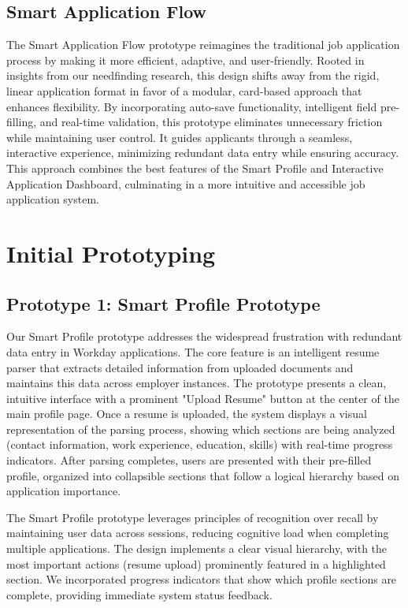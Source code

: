 \documentclass[
	letterpaper, %
]{jdf}
\begin{document}
\subsection{Smart Application Flow}
The Smart Application Flow prototype reimagines the traditional job application process by making it more efficient, adaptive, and user-friendly. Rooted in insights from our needfinding research, this design shifts away from the rigid, linear application format in favor of a modular, card-based approach that enhances flexibility. By incorporating auto-save functionality, intelligent field pre-filling, and real-time validation, this prototype eliminates unnecessary friction while maintaining user control. It guides applicants through a seamless, interactive experience, minimizing redundant data entry while ensuring accuracy. This approach combines the best features of the Smart Profile and Interactive Application Dashboard, culminating in a more intuitive and accessible job application system.

\hfill \break
\hfill \break


\section{Initial Prototyping}
\subsection{Prototype 1: Smart Profile Prototype}
Our Smart Profile prototype addresses the widespread frustration with redundant data entry in Workday applications. The core feature is an intelligent resume parser that extracts detailed information from uploaded documents and maintains this data across employer instances.
The prototype presents a clean, intuitive interface with a prominent "Upload Resume" button at the center of the main profile page. Once a resume is uploaded, the system displays a visual representation of the parsing process, showing which sections are being analyzed (contact information, work experience, education, skills) with real-time progress indicators. After parsing completes, users are presented with their pre-filled profile, organized into collapsible sections that follow a logical hierarchy based on application importance.

The Smart Profile prototype leverages principles of recognition over recall by maintaining user data across sessions, reducing cognitive load when completing multiple applications. The design implements a clear visual hierarchy, with the most important actions (resume upload) prominently featured in a highlighted section. We incorporated progress indicators that show which profile sections are complete, providing immediate system status feedback.
\end{document}
